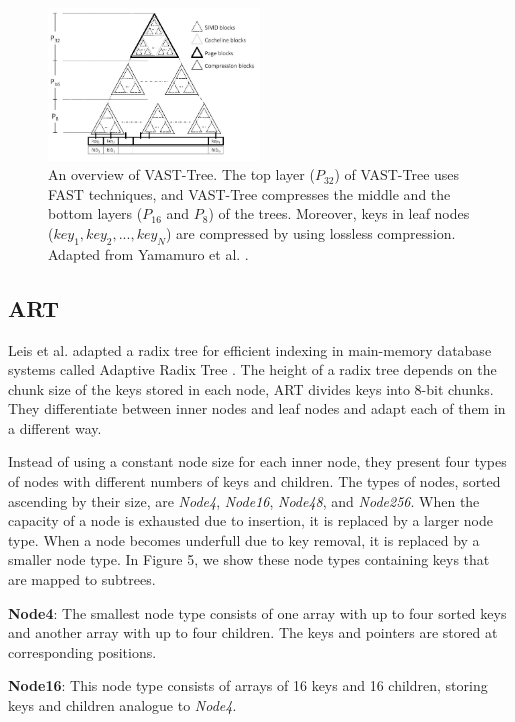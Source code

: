 \documentclass[conference]{IEEEtran}
\begin{document}
\begin{figure}
	\includegraphics[width=0.5\textwidth]{figure_5.png}
	\caption{An overview of VAST-Tree. The top layer ($P_{32}$) of VAST-Tree uses FAST techniques, and VAST-Tree compresses the middle and the bottom layers ($P_{16}$ and $P_8$) of the trees. Moreover, keys in leaf nodes ($key_1, key_2, ...,	key_N$) are compressed by using lossless compression. Adapted from Yamamuro et al. \cite{b5}.}
	\label{fig}
\end{figure}


\subsection{ART}\label{SCM}
Leis et al. adapted a radix tree for efficient indexing in main-memory database systems called Adaptive Radix Tree \cite{b4}. The height of a radix tree depends on the chunk size of the keys stored in each node, ART divides keys into 8-bit chunks. They differentiate between inner nodes and leaf nodes and adapt each of them in a different way.

Instead of using a constant node size for each inner node, they present four types of nodes with different numbers of keys and children. The types of nodes, sorted ascending by their size, are \emph{Node4}, \emph{Node16}, \emph{Node48}, and \emph{Node256}. When the capacity of a node is exhausted due to insertion, it is replaced by a larger node type. When a node becomes underfull due to key removal, it is replaced by a smaller node type. In Figure 5, we show these node types containing keys that are mapped to subtrees.

\textbf{Node4}: The smallest node type consists of one array with up to four sorted keys and another array with up to four children. The keys and pointers are stored at corresponding positions.

\textbf{Node16}: This node type consists of arrays of 16 keys and 16 children, storing keys and children analogue to \emph{Node4}.
\end{document}
